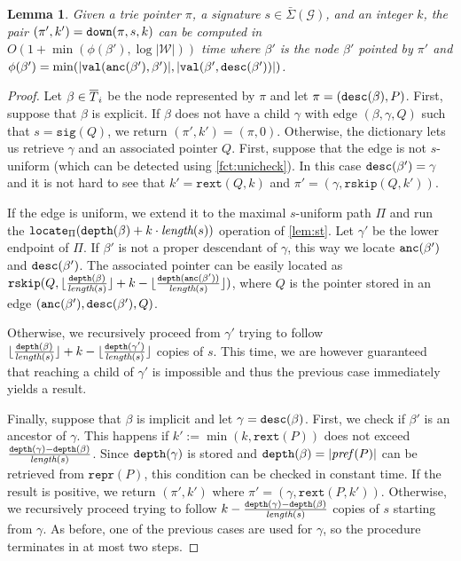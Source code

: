 \documentclass[a4paper]{article}
\newtheorem{lemma}[theorem]{Lemma}
\theoremstyle{remark}
\newcommand{\sigs}{\bar{\Sigma}}
\newcommand{\grammar}{\mathcal{G}}
\newcommand{\slength}{\textit{length}}
\newcommand{\coll}{\mathcal{W}}
\newcommand{\itrepr}{\mathtt{repr}}
\newcommand{\itsig}{\mathtt{sig}}
\newcommand{\itrskip}{\mathtt{rskip}}
\newcommand{\itrext}{\mathtt{rext}}
\begin{document}
\begin{lemma}\label{lem:down}
  Given a trie pointer $\pi$, a signature $s\in \sigs(\grammar)$, and an integer $k$, the pair $(\pi',k')=\mathtt{down}(\pi,s,k)$
can be computed in $O(1+\min(\phi(\beta'),\log |\coll|))$ time where $\beta'$ is the node $\beta'$ pointed by $\pi'$
and $\phi(\beta')=\min(|\mathtt{val}(\mathtt{anc}(\beta'),\beta')|,|\mathtt{val}(\beta',\mathtt{desc}(\beta'))|)$.
\end{lemma}
\begin{proof}
Let $\beta\in \overline{T}_i$ be the node represented by $\pi$ and let $\pi=(\mathtt{desc}(\beta),P)$.
First, suppose that $\beta$ is explicit.
If $\beta$ does not have a child $\gamma$ with edge $(\beta,\gamma,Q)$ such that $s=\itsig(Q)$, we return $(\pi',k')=(\pi,0)$.
Otherwise, the dictionary lets us retrieve $\gamma$ and an associated pointer $Q$.
First, suppose that the edge is not $s$-uniform (which can be detected using \cref{fct:unicheck}).
In this case $\mathtt{desc}(\beta')=\gamma$ and it is not hard to see that $k'=\itrext(Q,k)$
and $\pi'=(\gamma,\itrskip(Q,k'))$.

If the edge is uniform, we extend it to the maximal $s$-uniform path $\Pi$
and run the \linebreak
$\tlocate_{\Pi}(\tdepth(\beta)+k\cdot \slength(s))$ operation of \cref{lem:st}.
Let $\gamma'$ be the lower endpoint of $\Pi$. If $\beta'$ is not a proper descendant
of $\gamma$, this way we locate $\mathtt{anc}(\beta')$ and $\mathtt{desc}(\beta')$.
The associated pointer can be easily located as
$\itrskip(Q,\lfloor\frac{\tdepth(\beta)}{\slength(s)}\rfloor+k-\lfloor\frac{\tdepth(\tanc(\beta'))}{\slength(s)}\rfloor)$,
where $Q$ is the pointer stored in an edge $(\mathtt{anc}(\beta'),\mathtt{desc}(\beta'),Q)$.

Otherwise, we recursively proceed from $\gamma'$ trying to follow $\lfloor\frac{\tdepth(\beta)}{\slength(s)}\rfloor+k-\lfloor\frac{\tdepth(\gamma')}{\slength(s)}\rfloor$
copies of $s$. This time, we are however guaranteed that reaching a child of $\gamma'$ is impossible and
thus the previous case immediately yields a result.

Finally, suppose that $\beta$ is implicit and let $\gamma=\mathtt{desc}(\beta)$.
First, we check if $\beta'$ is an ancestor of $\gamma$.
This happens if $k':=\min(k,\itrext(P))$ does not exceed $\frac{\tdepth(\gamma)-\tdepth(\beta)}{\slength(s)}$.
Since $\mathtt{depth}(\gamma)$ is stored and $\mathtt{depth}(\beta)=|\mathit{pref}(P)|$ can be retrieved from $\itrepr(P)$,
this condition can be checked in constant time. If the result is positive, we return $(\pi',k')$
where $\pi'=(\gamma,\itrext(P,k'))$.
Otherwise, we recursively proceed trying to follow $k-\frac{\tdepth(\gamma)-\tdepth(\beta)}{\slength(s)}$ copies
of $s$ starting from $\gamma$. As before, one of the previous cases are used for $\gamma$,
so the procedure terminates in at most two steps.
\end{proof}
\end{document}
